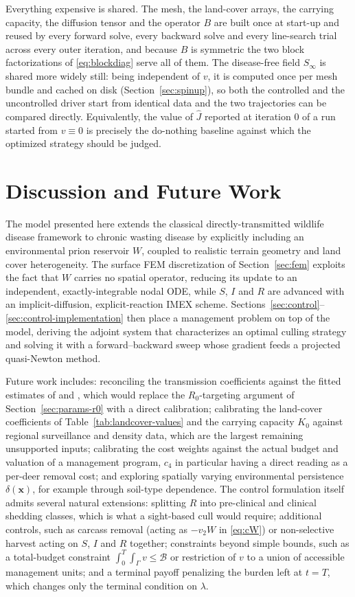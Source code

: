 \documentclass[11pt]{article}
\begin{document}
Everything expensive is shared. The mesh, the land-cover arrays, the carrying capacity, the diffusion tensor and the operator $B$ are built once at start-up and reused by every forward solve, every backward solve and every line-search trial across every outer iteration, and because $B$ is symmetric the two block factorizations of \eqref{eq:blockdiag} serve all of them. The disease-free field $S_\infty$ is shared more widely still: being independent of $v$, it is computed once per mesh bundle and cached on disk (Section~\ref{sec:spinup}), so both the controlled and the uncontrolled driver start from identical data and the two trajectories can be compared directly. Equivalently, the value of $\hat J$ reported at iteration $0$ of a run started from $v\equiv0$ is precisely the do-nothing baseline against which the optimized strategy should be judged.

\section{Discussion and Future Work}

The model presented here extends the classical directly-transmitted wildlife disease framework to chronic wasting disease by explicitly including an environmental prion reservoir $W$, coupled to realistic terrain geometry and land cover heterogeneity. The surface FEM discretization of Section~\ref{sec:fem} exploits the fact that $W$ carries no spatial operator, reducing its update to an independent, exactly-integrable nodal ODE, while $S$, $I$ and $R$ are advanced with an implicit-diffusion, explicit-reaction IMEX scheme. Sections~\ref{sec:control}--\ref{sec:control-implementation} then place a management problem on top of the model, deriving the adjoint system that characterizes an optimal culling strategy and solving it with a forward--backward sweep whose gradient feeds a projected quasi-Newton method.

Future work includes: reconciling the transmission coefficients against the fitted estimates of \citet{Wasserberg2009} and \citet{Miller2006}, which would replace the $R_0$-targeting argument of Section~\ref{sec:params-r0} with a direct calibration; calibrating the land-cover coefficients of Table~\ref{tab:landcover-values} and the carrying capacity $K_0$ against regional surveillance and density data, which are the largest remaining unsupported inputs; calibrating the cost weights against the actual budget and valuation of a management program, $c_4$ in particular having a direct reading as a per-deer removal cost; and exploring spatially varying environmental persistence $\delta(\mathbf{x})$, for example through soil-type dependence. The control formulation itself admits several natural extensions: splitting $R$ into pre-clinical and clinical shedding classes, which is what a sight-based cull would require; additional controls, such as carcass removal (acting as $-v_2 W$ in \eqref{eq:cW}) or non-selective harvest acting on $S$, $I$ and $R$ together; constraints beyond simple bounds, such as a total-budget constraint $\int_0^T\int_\Gamma v \le \mathcal{B}$ or restriction of $v$ to a union of accessible management units; and a terminal payoff penalizing the burden left at $t=T$, which changes only the terminal condition on $\lambda$.



\end{document}
